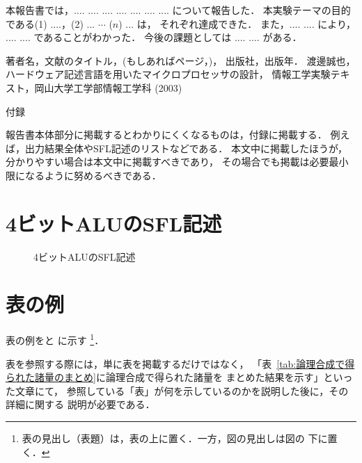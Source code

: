 \documentclass{jarticle}[11pt]
\newcommand{\tabref}[1]{\makebox{表~\ref{#1}}}
\begin{document}
\noindent

本報告書では，.... .... .... .... .... .... .... について報告した．
本実験テーマの目的である(1) ....，(2) ... $\cdots$ ($n$) ... は，
それぞれ達成できた．
また，.... .... により， .... .... であることがわかった．
今後の課題としては .... .... がある．

\begin{thebibliography}{99}
 著者名，文献のタイトル，(もしあればページ，)，
出版社，出版年．
渡邊誠也，ハードウェア記述言語を用いたマイクロプロセッサの設計，
情報工学実験テキスト，岡山大学工学部情報工学科 (2003)
\end{thebibliography}


\newpage
\appendix

\noindent
{\Large \gt 付録}

報告書本体部分に掲載するとわかりにくくなるものは，付録に掲載する．
例えば，出力結果全体やSFL記述のリストなどである．
本文中に掲載したほうが，分かりやすい場合は本文中に掲載すべきであり，
その場合でも掲載は必要最小限になるように努めるべきである．

\section{4ビットALUのSFL記述}
\label{appsec:4ビットALUのSFL記述}

\begin{figure}[hbtp]
\begin{center}

\caption{4ビットALUのSFL記述}
\label{fig:4ビットALUのSFL記述}
\end{center}
\end{figure}

\section{表の例}

表の例を\tabref{tab:論理合成で得られた諸量のまとめ}と
\tabref{tab:マイクロプロセッサp16の設計状況}に示す
\footnote{表の見出し（表題）は，表の上に置く．一方，図の見出しは図の
下に置く．}．

表を参照する際には，単に表を掲載するだけではなく，
「表~\ref{tab:論理合成で得られた諸量のまとめ}に論理合成で得られた諸量を
まとめた結果を示す」といった文章にて，
参照している「表」が何を示しているのかを説明した後に，その詳細に関する
説明が必要である．
\end{document}
